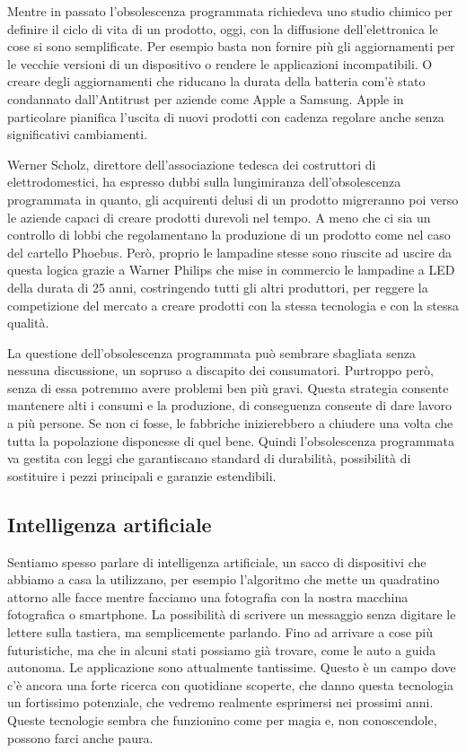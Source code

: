 \documentclass[12pt]{book} %
\begin{document}
Mentre in passato l'obsolescenza programmata richiedeva uno studio chimico per definire il ciclo di
vita di un prodotto, oggi, con la diffusione dell'elettronica le cose si sono semplificate. Per
esempio basta non fornire più gli aggiornamenti per le vecchie versioni di un dispositivo o rendere le applicazioni
incompatibili. O creare degli aggiornamenti che riducano la durata della batteria com'è stato
condannato dall'Antitrust per aziende come Apple a Samsung. Apple in particolare pianifica l'uscita di nuovi prodotti con cadenza regolare anche senza significativi cambiamenti. 

Werner Scholz, direttore dell'associazione tedesca dei costruttori di elettrodomestici, ha espresso dubbi sulla
lungimiranza dell'obsolescenza programmata in quanto, gli acquirenti delusi di un prodotto migreranno poi verso le
aziende capaci di creare prodotti durevoli nel tempo. A meno che ci sia un controllo di lobbi che regolamentano la
produzione di un prodotto come nel caso del cartello Phoebus. Però, proprio le lampadine stesse sono riuscite ad uscire
da questa logica grazie a Warner Philips che mise in commercio le lampadine a LED della durata di 25 anni, costringendo
tutti gli altri produttori, per reggere la competizione del mercato a creare prodotti con la stessa tecnologia e con la
stessa qualità.

La questione dell'obsolescenza programmata può sembrare sbagliata senza nessuna discussione, un
sopruso a discapito dei consumatori. Purtroppo però, senza di essa potremmo avere problemi ben più gravi. Questa strategia
consente mantenere alti i consumi e la produzione, di conseguenza consente di dare lavoro a più persone. Se non ci
fosse, le fabbriche inizierebbero a chiudere una volta che tutta la popolazione disponesse di quel bene. 
Quindi l'obsolescenza programmata va gestita con leggi che garantiscano standard di durabilità, possibilità di
sostituire i pezzi principali e garanzie estendibili.

\subsection{Intelligenza artificiale}
Sentiamo spesso parlare di intelligenza artificiale, un sacco di dispositivi che abbiamo a casa la utilizzano, per
esempio l'algoritmo che mette un quadratino attorno alle facce mentre facciamo una fotografia con
la nostra macchina fotografica o smartphone. La possibilità di scrivere un messaggio senza digitare le lettere sulla
tastiera, ma semplicemente parlando. Fino ad arrivare a cose più futuristiche, ma che in alcuni stati possiamo già
trovare, come le auto a guida autonoma. Le applicazione sono attualmente tantissime. Questo è un campo dove
c'è ancora una forte ricerca con quotidiane scoperte, che danno questa tecnologia un fortissimo
potenziale, che vedremo realmente esprimersi nei prossimi anni. Queste tecnologie sembra che funzionino come per magia
e, non conoscendole, possono farci anche paura. 
\end{document}

